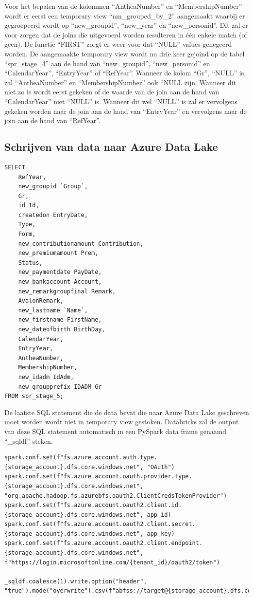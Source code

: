 Voor het bepalen van de kolommen ``AntheaNumber'' en ``MembershipNumber'' wordt er eerst een temporary view ``nm\_grouped\_by\_2'' aangemaakt waarbij er gegroepeerd wordt op ``new\_groupid'', ``new\_year'' en ``new\_personid''. Dit zal er voor zorgen dat de joins die uitgevoerd worden resulteren in één enkele match (of geen). De functie ``FIRST'' zorgt er weer voor dat ``NULL'' values genegeerd worden. De aangemaakte temporary view wordt nu drie keer gejoind op de tabel ``spr\_stage\_4'' aan de hand van ``new\_groupid'', ``new\_personid'' en ``CalendarYear'', ``EntryYear'' of ``RefYear''. Wanneer de kolom ``Gr'', ``NULL'' is, zal ``AntheaNumber'' en ``MembershipNumber'' ook ``NULL zijn. Wanneer dit niet zo is wordt eerst gekeken of de waarde van de join aan de hand van ``CalendarYear'' niet ``NULL'' is. Wanneer dit wel ``NULL'' is zal er vervolgens gekeken worden naar de join aan de hand van ``EntryYear'' en vervolgens naar de join aan de hand van ``RefYear''.

\subsection{Schrijven van data naar Azure Data Lake}

\begin{verbatim}
SELECT 
    RefYear, 
    new_groupid `Group`,
    Gr, 
    id Id, 
    createdon EntryDate,
    Type,
    Form,
    new_contributionamount Contribution,
    new_premiumamount Prem,
    Status,
    new_paymentdate PayDate,
    new_bankaccount Account,
    new_remarkgroupfinal Remark,
    AvalonRemark,
    new_lastname `Name`,
    new_firstname FirstName,
    new_dateofbirth BirthDay,
    CalendarYear,
    EntryYear,
    AntheaNumber,
    MembershipNumber,
    new_idadm IdAdm,
    new_groupprefix IDADM_Gr
FROM spr_stage_5;
\end{verbatim}

De laatste SQL statement die de data bevat die naar Azure Data Lake geschreven moet worden wordt niet in temporary view gestoken. Databricks zal de output van deze SQL statement automatisch in een PySpark data frame genaamd ``\_sqldf'' steken.

\begin{verbatim}
spark.conf.set(f"fs.azure.account.auth.type.{storage_account}.dfs.core.windows.net", "OAuth")
spark.conf.set(f"fs.azure.account.oauth.provider.type.{storage_account}.dfs.core.windows.net", "org.apache.hadoop.fs.azurebfs.oauth2.ClientCredsTokenProvider")
spark.conf.set(f"fs.azure.account.oauth2.client.id.{storage_account}.dfs.core.windows.net", app_id)
spark.conf.set(f"fs.azure.account.oauth2.client.secret.{storage_account}.dfs.core.windows.net", app_key)
spark.conf.set(f"fs.azure.account.oauth2.client.endpoint.{storage_account}.dfs.core.windows.net", f"https://login.microsoftonline.com/{tenant_id}/oauth2/token")

_sqldf.coalesce(1).write.option("header", "true").mode("overwrite").csv(f"abfss://target@{storage_account}.dfs.core.windows.net/databricks")
\end{verbatim}

